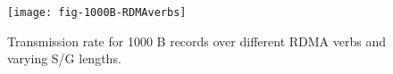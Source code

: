 \begin{figure}[H]
\texttt{[image: fig-1000B-RDMAverbs]}
\caption{Transmission rate for 1000 B records over different RDMA verbs and 
varying S/G lengths.}
\label{fig:1000B_transrate}
\end{figure}

